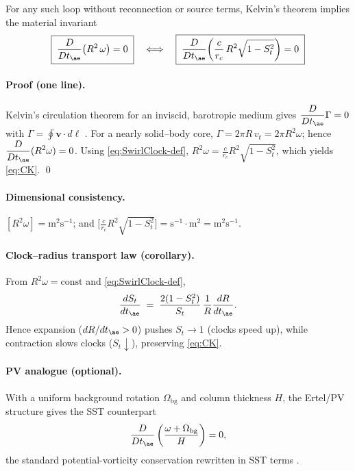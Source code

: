 \documentclass[11pt]{article}
\begin{document}
    \begin{theorem}
        For any such loop without reconnection or source terms, Kelvin’s theorem implies the
        material invariant
        \begin{equation}
            \boxed{\;
            \frac{D}{Dt_{\ae}}\!\left(R^2\,\omega\right)=0
            \;}
            \quad\Longleftrightarrow\quad
            \boxed{\;
            \frac{D}{Dt_{\ae}}\!\left(
                                    \frac{c}{r_c}\,R^2 \sqrt{1-S_t^2}
            \right)=0
            \;}
            \label{eq:CK}
        \end{equation}
    \end{theorem}

    \paragraph{Proof (one line).}
    Kelvin’s circulation theorem for an inviscid, barotropic medium gives
    $\displaystyle \frac{D}{Dt_{\ae}}\Gamma=0$ with $\Gamma=\oint \mathbf{v}\cdot d\boldsymbol{\ell}$ \cite{Helmholtz1858,Kelvin1869,Batchelor1967}.
    For a nearly solid–body core, $\Gamma=2\pi R\, v_t=2\pi R^2 \omega$; hence
    $\displaystyle \frac{D}{Dt_{\ae}}(R^2\omega)=0$.
    Using \eqref{eq:SwirlClock-def}, $R^2\omega=\tfrac{c}{r_c} R^2\sqrt{1-S_t^2}$, which yields \eqref{eq:CK}. \qed

    \paragraph{Dimensional consistency.}
    $[R^2\omega]=\text{m}^2\text{s}^{-1}$; and
    $\big[\tfrac{c}{r_c}R^2\sqrt{1-S_t^2}\big]=\text{s}^{-1}\cdot\text{m}^2=\text{m}^2\text{s}^{-1}$.

    \paragraph{Clock–radius transport law (corollary).}
    From $R^2\omega=\text{const}$ and \eqref{eq:SwirlClock-def},
    \begin{equation}
        \frac{dS_t}{dt_{\ae}} \;=\; \frac{2(1-S_t^2)}{S_t}\,\frac{1}{R}\frac{dR}{dt_{\ae}} .
        \label{eq:clock-radius-ode}
    \end{equation}
    Hence expansion ($dR/dt_{\ae}>0$) pushes $S_t\!\to\!1$ (clocks speed up), while contraction
    slows clocks ($S_t\!\downarrow$), preserving \eqref{eq:CK}.

    \paragraph{PV analogue (optional).}
    With a uniform background rotation $\Omega_{\text{bg}}$ and column thickness $H$,
    the Ertel/PV structure gives the SST counterpart
    \begin{equation}
        \frac{D}{Dt_{\ae}}
        \left(
            \frac{\omega+\Omega_{\text{bg}}}{H}
        \right)=0,
        \label{eq:PV-analogue}
    \end{equation}
    the standard potential-vorticity conservation rewritten in SST terms \cite{Ertel1942,Batchelor1967}.
\end{document}
